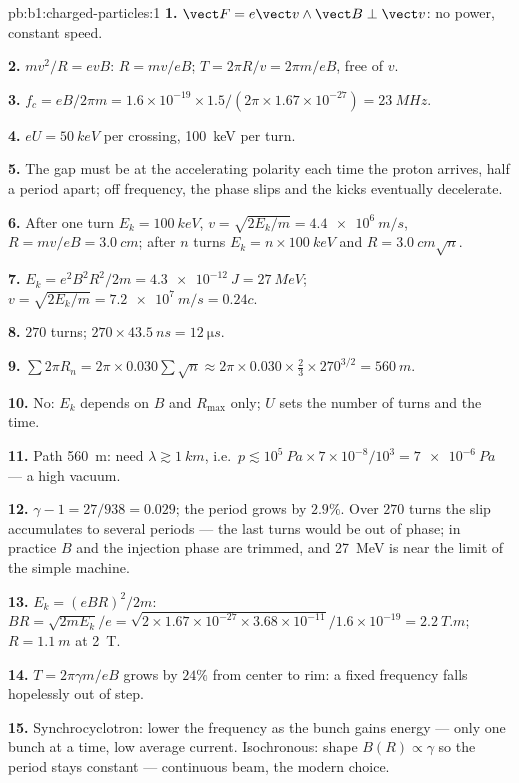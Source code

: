 \begin{solution}{pb:b1:charged-particles:1}
\textbf{1.} $\vect F = e\vect v\wedge\vect B \perp \vect v$: no power, constant
speed.

\textbf{2.} $mv^2/R = evB$: $R = mv/eB$; $T = 2\pi R/v = 2\pi m/eB$, free of
$v$.

\textbf{3.} $f_c = eB/2\pi m = 1.6\times10^{-19} \times 1.5/(2\pi \times 1.67
\times10^{-27}) = \qty{23}{MHz}$.

\textbf{4.} $eU = \qty{50}{keV}$ per crossing, \qty{100}{keV} per turn.

\textbf{5.} The gap must be at the accelerating polarity each time the
proton arrives, half a period apart; off frequency, the phase slips and
the kicks eventually decelerate.

\textbf{6.} After one turn $E_k = \qty{100}{keV}$, $v = \sqrt{2E_k/m} =
\qty{4.4e6}{m/s}$, $R = mv/eB = \qty{3.0}{cm}$; after $n$ turns $E_k =
n \times \qty{100}{keV}$ and $R = \qty{3.0}{cm}\sqrt n$.

\textbf{7.} $E_k = e^2B^2R^2/2m = \qty{4.3e-12}{J} = \qty{27}{MeV}$; $v =
\sqrt{2E_k/m} = \qty{7.2e7}{m/s} = 0.24c$.

\textbf{8.} $270$ turns; $270 \times \qty{43.5}{ns} = \qty{12}{\micro s}$.

\textbf{9.} $\sum 2\pi R_n = 2\pi \times 0.030\sum\sqrt n \approx 2\pi \times 0.030
\times \tfrac23 \times 270^{3/2} = \qty{560}{m}$.

\textbf{10.} No: $E_k$ depends on $B$ and $R_{\max}$ only; $U$ sets the
number of turns and the time.

\textbf{11.} Path \qty{560}{m}: need $\lambda \gtrsim \qty{1}{km}$, i.e.\
$p \lesssim 10^5\ \unit{Pa} \times 7\times10^{-8}/10^3 = \qty{7e-6}{Pa}$ ---
a high vacuum.

\textbf{12.} $\gamma - 1 = 27/938 = 0.029$; the period grows by $2.9\%$.
Over $270$ turns the slip accumulates to several periods --- the last
turns would be out of phase; in practice $B$ and the injection phase are
trimmed, and \qty{27}{MeV} is near the limit of the simple machine.

\textbf{13.} $E_k = (eBR)^2/2m$: $BR = \sqrt{2mE_k}/e = \sqrt{2 \times 1.67\times
10^{-27} \times 3.68\times10^{-11}}/1.6\times10^{-19} = \qty{2.2}{T.m}$; $R =
\qty{1.1}{m}$ at \qty{2}{T}.

\textbf{14.} $T = 2\pi\gamma m/eB$ grows by $24\%$ from center to rim: a
fixed frequency falls hopelessly out of step.

\textbf{15.} Synchrocyclotron: lower the frequency as the bunch gains
energy --- only one bunch at a time, low average current. Isochronous:
shape $B(R) \propto \gamma$ so the period stays constant --- continuous
beam, the modern choice.


\end{solution}
